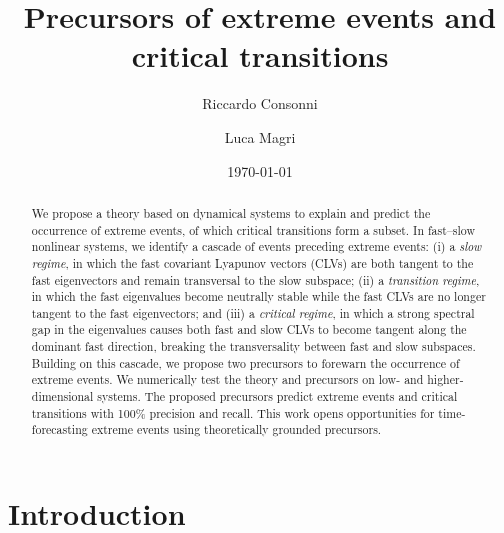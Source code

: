 \documentclass[aps,reprint,prx]{revtex4-2}
\begin{document}

\title{\textbf{Precursors of extreme events and critical transitions} 
}%


\author{Riccardo Consonni}
\author{Luca Magri}%
%

\date{\today}%

\begin{abstract}
We propose a theory based on dynamical systems to explain and predict the occurrence of extreme events, of which critical transitions form a subset. In fast–slow nonlinear systems, we identify a cascade of events preceding extreme events:
(i) a {\it slow regime}, in which the fast covariant Lyapunov vectors (CLVs) are both tangent to the fast eigenvectors and remain transversal to the slow subspace;
(ii) a {\it transition regime}, in which the fast eigenvalues become neutrally stable while the fast CLVs are no longer tangent to the fast eigenvectors; and
(iii) a {\it critical regime}, in which a strong spectral gap in the eigenvalues causes both fast and slow CLVs to become tangent along the dominant fast direction, breaking the transversality between fast and slow subspaces.
Building on this cascade, we propose two precursors to forewarn the occurrence of extreme events. We numerically test the theory and precursors on low- and higher-dimensional systems. The proposed precursors predict extreme events and critical transitions with 100\% precision and recall. This work opens  opportunities for time-forecasting extreme events  using theoretically grounded precursors. 
\end{abstract}

\maketitle


\section{\label{into}Introduction}
\end{document}
